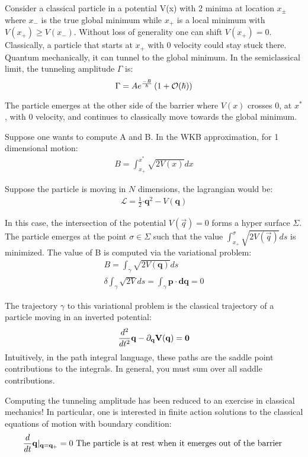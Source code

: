 \documentclass[11pt]{scrartcl}
\begin{document}
Consider a classical particle in a potential V(x) with 2 minima at location $x_{\pm}$ where $x_-$ is the true global minimum while $x_+$ is a local minimum with $V(x_+) \geq V(x_-)$.  Without loss of generality one can shift $V(x_+) = 0$.   Classically, a particle that starts at $x_+$ with 0 velocity could stay stuck there.  Quantum mechanically, it can tunnel to the global minimum.  
In the semiclassical limit, the tunneling amplitude $\Gamma$ is:
\[ \Gamma = A e^{-B \over \hbar} \left(1 + \mathcal{O} (\hbar) \right) \]

The particle emerges at the other side of the barrier where $V(x)$ crosses 0, at $x^*$, with 0 velocity, and continues to classically move towards the global minimum.

Suppose one wants to compute A and B.  In the WKB approximation, for 1 dimensional motion:
\begin{align}
	B = \int_{x_+}^{x^*} \sqrt{2 V(x)} dx
	\end{align}

Suppose the particle is moving in $N$ dimensions, the lagrangian would be:
\begin{align}
	\mathcal{L} = \frac12 \mathbf{\cdot{q}}^2 - V(\mathbf{q})
	\end{align}

In this case, the intersection of the potential $V(\vec{q}) = 0$ forms a hyper surface $ \Sigma$.  The particle emerges at the point $\sigma \in \Sigma$ such that the value $\int_{x_+}^{\sigma} \sqrt{2 V(\vec{q})} ds$ is minimized.  The value of B is computed via the variational problem:
\begin{align}
	B = \int_{\gamma} \sqrt{2 V(\mathbf{q})} ds \\
	\delta \int_{\gamma} \sqrt{2 V} ds = \int_{\gamma} \mathbf{p} \cdot \mathbf{dq} = 0
	\end{align}

The trajectory $\gamma$ to this variational problem is the classical trajectory of a particle moving in an inverted potential:
\begin{align}
	{d^2 \over dt^2} \bf{q} - \partial_{\bf{q}} V(\bf{q}) = 0
	\end{align}
Intuitively, in the path integral language, these paths are the saddle point contributions to the integrals.  In general, you must sum over all saddle contributions.

Computing the tunneling amplitude has been reduced to an exercise in classical mechanics!  In particular, one is interested in finite action solutions to the classical equations of motion with boundary condition:
\begin{align}
	{d \over dt} \bf{q}|_{\bf{q} = \bf{q_+}} &= 0 \text{  The particle is at rest when it emerges out of the barrier } \\
\end{align}
\end{document}
